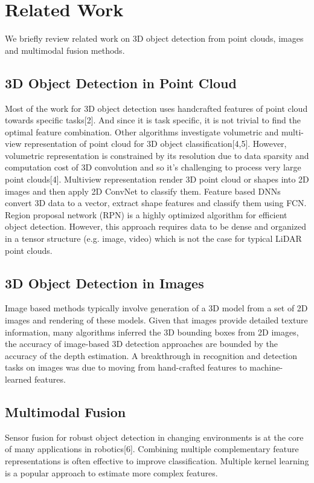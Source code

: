 \documentclass{article}
\begin{document}
\section{Related Work}
We briefly review related work on 3D object detection from point clouds, images and multimodal fusion methods.

\subsection{3D Object Detection in Point Cloud}

Most of the work for 3D object detection uses handcrafted features of point cloud towards specific tasks[2]. And since it is task specific, it is not trivial to find the optimal feature combination. Other algorithms investigate volumetric and multi-view representation of point cloud for 3D object classification[4,5]. However, volumetric representation is constrained by its resolution due to data sparsity and computation cost of 3D convolution and so it’s challenging to process very large point clouds[4]. Multiview representation render 3D point cloud or shapes into 2D images and then apply 2D ConvNet to classify them. Feature based DNNs convert 3D data to a vector, extract shape features and classify them using FCN. Region proposal network (RPN) is a highly optimized algorithm for efficient object detection. However, this approach requires data to be dense and organized in a tensor structure (e.g. image, video) which is not the case for typical LiDAR point clouds.

\subsection{3D Object Detection in Images}

Image based methods typically involve generation of a 3D model from a set of 2D images and rendering of these models. Given that images provide detailed texture information, many algorithms inferred the 3D bounding boxes from 2D images, the accuracy of image-based 3D detection approaches are bounded by the accuracy of the depth estimation. A breakthrough in recognition and detection tasks on images was due to moving from hand-crafted features to machine-learned features.

\subsection{Multimodal Fusion}

Sensor fusion for robust object detection in changing environments is at the core of many applications in robotics[6]. Combining multiple complementary feature representations is often effective to improve classification. Multiple kernel learning is a popular approach to estimate more complex features.
\end{document}
